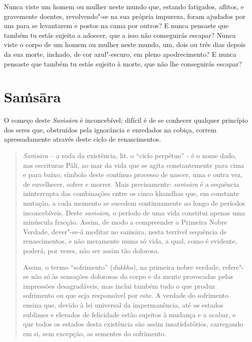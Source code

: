 Nunca viste um homem ou mulher neste mundo que, estando fatigados, aflitos, e
gravemente doentes, revolvendo"-se na sua própria impureza, foram ajudados por
uns para se levantarem e postos na cama por outros? E nunca pensaste que também
tu estás sujeito a adoecer, que a isso não conseguirás escapar? Nunca viste o
corpo de um homem ou mulher neste mundo, um, dois ou três dias depois da sua
morte, inchado, de cor azul"-escuro, em pleno apodrecimento? E nunca pensaste que
também tu estás sujeito à morte, que não lhe conseguirás escapar?


\section{Sa\.{m}sāra}

O começo deste \emph{Saṁsāra} é inconcebível; difícil é de se conhecer qualquer
princípio dos seres que, obstruídos pela ignorância e enredados na cobiça,
correm apressadamente através deste ciclo de renascimentos.


\begin{quote}
  \emph{Sa\.{m}sāra} -- a roda da existência, lit. o “ciclo perpétuo” - é o
  nome dado, nas escrituras Pāli, ao mar da vida que se agita constantemente
  para cima e para baixo, símbolo deste contínuo processo de nascer, uma e outra
  vez, de envelhecer, sofrer e morrer. Mais precisamente: \emph{sa\.{m}sāra} é a
  sequência ininterrupta das combinações entre os cinco khandhas que, em
  constante mutação, a cada momento se sucedem continuamente ao longo de
  períodos inconcebíveis. Deste \emph{sa\.{m}sāra}, o período de uma vida constitui apenas
  uma minúscula fracção. Assim, de modo a compreender a Primeira Nobre Verdade,
  dever"-se-á meditar no saṁsāra, nesta terrível sequência de renascimentos, e
  não meramente numa só vida, a qual, como é evidente, poderá, por vezes, não
  ser assim tão dolorosa.

  Assim, o termo “sofrimento” (\emph{dukkha}), na primeira nobre verdade,
  refere"-se não só às sensações dolorosas do corpo e da mente provocadas pelas
  impressões desagradáveis, mas inclui também tudo o que produz sofrimento ou
  que seja responsável por este. A verdade do sofrimento ensina que, devido à
  lei universal da impermanência, até os estados sublimes e elevados de
  felicidade estão sujeitos à mudança e a acabar, e que todos os estados desta
  existência são assim insatisfatórios, carregando em si, sem excepção, as
  sementes do sofrimento.
\end{quote}

